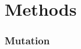 \section{Methods}
\label{sec:methods}
\subsubsection{Mutation}
\iffalse
\begin{figure}[h!]
        \centering
        \texttt{[image: mutation.png]}
        \caption{Example of mutation.  Yellow indicates the chips that is
involved in mutation.}
        \label{fig:mutation}
\end{figure}
\fi
